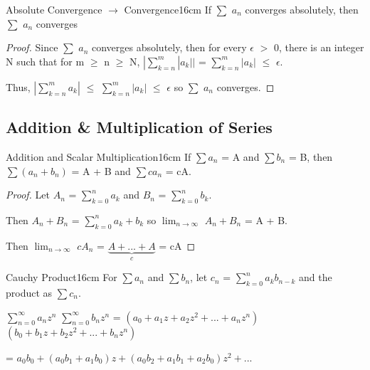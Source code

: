     \vspace{0.5cm}



    \begin{wtheorem}{Absolute Convergence $\rightarrow$ Convergence}{16cm}
        If $\sum$ $a_n$ converges absolutely, then $\sum$ $a_n$ converges
    \end{wtheorem}

    \begin{proof}
        Since $\sum$ $a_n$ converges absolutely, then for every
        $\epsilon$ $>$ 0, there is an integer N such that for m $\geq$ n $\geq$ N,
        $|\sum_{k=n}^m |a_k||$ = $\sum_{k=n}^m |a_k|$ $\leq$ $\epsilon$.

        Thus, 
        $|\sum_{k=n}^m a_k|$
        $\leq$ $\sum_{k=n}^m |a_k|$
        $\leq$ $\epsilon$
        so $\sum$ $a_n$ converges.
    \end{proof}

    \vspace{0.5cm}





\subsection[ Addition \& Multiplication ]{ Addition \& Multiplication of Series }

    \begin{wtheorem}{Addition and Scalar Multiplication}{16cm}
        If $\sum a_n$ = A and $\sum b_n$ = B, then
        $\sum (a_n + b_n)$ = A + B and $\sum ca_n$ = cA.
    \end{wtheorem}

    \begin{proof}
        Let $A_n$ = $\sum_{k=0}^n a_k$ and $B_n$ = $\sum_{k=0}^n b_k$.

        Then $A_n + B_n$ = $\sum_{k=0}^n a_k + b_k$
        so $\lim_{n \rightarrow \infty}$ $A_n + B_n$
        = A + B.

        Then $\lim_{n \rightarrow \infty}$ $cA_n$
        = $\underbrace{A + ... + A}_c$ = cA
    \end{proof}

    \newpage



    \begin{definition}{Cauchy Product}{16cm}
        For $\sum a_n$ and $\sum b_n$, let
        $c_n$ = $\sum_{k=0}^n a_k b_{n-k}$
        and the product as $\sum c_n$.

        \hspace{0.5cm}
        $\sum_{n=0}^{\infty} a_n z^n$ $\sum_{n=0}^{\infty} b_n z^n$
        = $(a_0 + a_1z + a_2z^2 + ... + a_nz^n)$
        $(b_0 + b_1z + b_2z^2 + ... + b_nz^n)$

        \hspace{4.6cm}
        = $a_0b_0 + (a_0b_1 + a_1b_0)z + (a_0b_2 + a_1b_1 + a_2b_0)z^2 + ... $
    \end{definition}

